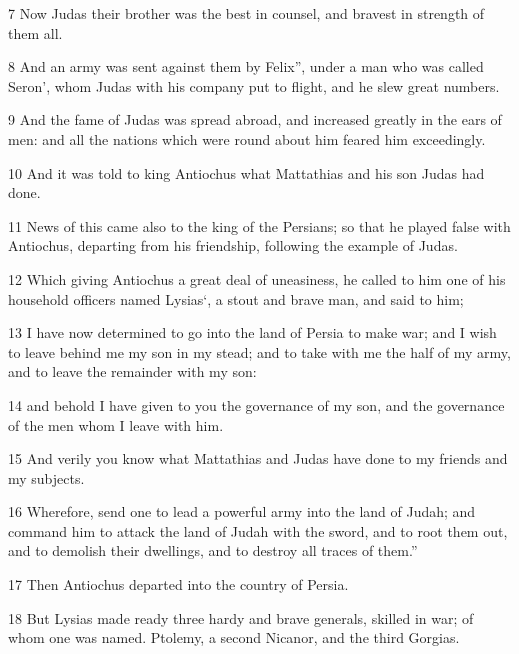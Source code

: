 \par 7 Now Judas their brother was the best in counsel, and bravest in strength of them all. 

\par 8 And an army was sent against them by Felix”, under a man who was called Seron’, whom Judas with his company put to flight, and he slew great numbers. 

\par 9 And the fame of Judas was spread abroad, and increased greatly in the ears of men: and all the nations which were round about him feared him exceedingly. 

\par 10 And it was told to king Antiochus what Mattathias and his son Judas had done. 

\par 11 News of this came also to the king of the Persians; so that he played false with Antiochus, departing from his friendship, following the example of Judas. 

\par 12 Which giving Antiochus a great deal of uneasiness, he called to him one of his household officers named Lysias‘, a stout and brave man, and said to him; 

\par 13 I have now determined to go into the land of Persia to make war; and I wish to leave behind me my son in my stead; and to take with me the half of my army, and to leave the remainder with my son: 

\par 14 and behold I have given to you the governance of my son, and the governance of the men whom I leave with him. 

\par 15 And verily you know what Mattathias and Judas have done to my friends and my subjects. 

\par 16 Wherefore, send one to lead a powerful army into the land of Judah; and command him to attack the land of Judah with the sword, and to root them out, and to demolish their dwellings, and to destroy all traces of them.” 

\par 17 Then Antiochus departed into the country of Persia. 

\par 18 But Lysias made ready three hardy and brave generals, skilled in war; of whom one was named. Ptolemy, a second Nicanor, and the third Gorgias. 

